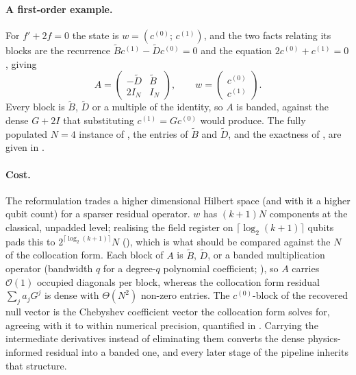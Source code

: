 \paragraph{A first-order example.}
For $f' + 2f = 0$ the state is $w = (c^{(0)};\, c^{(1)})$, and the two facts relating its blocks are the recurrence $\tilde{B}c^{(1)} - \tilde{D}c^{(0)} = 0$ and the equation $2c^{(0)} + c^{(1)} = 0$, giving
\begin{equation}
    A =
    \begin{pmatrix}
        -\tilde{D} & \tilde{B} \\[2pt]
        2 I_N & I_N
    \end{pmatrix},
    \qquad w = \begin{pmatrix} c^{(0)} \\ c^{(1)} \end{pmatrix} .
    \label{eq:descriptor-first-order}
\end{equation}
Every block is $\tilde{B}$, $\tilde{D}$ or a multiple of the identity, so $A$ is banded, against the dense $G + 2I$ that substituting $c^{(1)} = G c^{(0)}$ would produce. The fully populated $N = 4$ instance of , the entries of $\tilde{B}$ and $\tilde{D}$, and the exactness of , are given in .

\paragraph{Cost.}
The reformulation trades a higher dimensional Hilbert space (and with it a higher qubit count) for a sparser residual operator. $w$ has $(k+1)N$ components at the classical, unpadded level; realising the field register on $\lceil\log_2(k+1)\rceil$ qubits pads this to $2^{\lceil\log_2(k+1)\rceil}N$ (), which is what should be compared against the $N$ of the collocation form. Each block of $A$ is $\tilde{B}$, $\tilde{D}$, or a banded multiplication operator (bandwidth $q$ for a degree-$q$ polynomial coefficient; ), so $A$ carries $\mathcal{O}(1)$ occupied diagonals per block, whereas the collocation form residual $\sum_j a_j G^j$ is dense with $\Theta(N^2)$ non-zero entries. The $c^{(0)}$-block of the recovered null vector is the Chebyshev coefficient vector the collocation form solves for, agreeing with it to within numerical precision, quantified in . Carrying the intermediate derivatives instead of eliminating them converts the dense physics-informed residual into a banded one, and every later stage of the pipeline inherits that structure.

